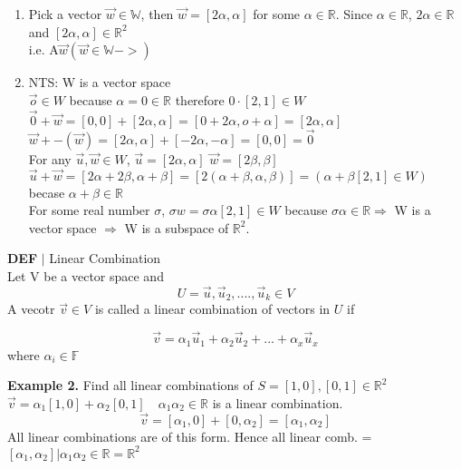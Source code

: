 \documentclass [12pt]{article}
\begin{document}
\begin{enumerate}
    \item Pick a vector $\overrightarrow{w}\in\mathbb{W}$, then $\overrightarrow{w}=[2\alpha,\alpha]$ for some $\alpha\in\mathbb{R}$. Since $\alpha\in\mathbb{R}$,  $2\alpha\in\mathbb{R}$ and  $[2\alpha,\alpha]\in\mathbb{R}^2$\\
    i.e. A$\overrightarrow{w}(\overrightarrow{w}\in\mathbb{W}->)$
    \item NTS: W is a vector space \\
    $\overrightarrow{o}\in W$ because $\alpha=0\in\mathbb{R}$ therefore $0\cdot[2,1]\in W$\\
    $\overrightarrow{0} + \overrightarrow{w} = [0,0] + [2\alpha,\alpha] = [0+2\alpha,o+\alpha]=[2\alpha,\alpha]$\\
    $\overrightarrow{w} + -(\overrightarrow{w}) = [2\alpha,\alpha] + [-2\alpha,-\alpha] = [0,0] = \overrightarrow{0}$\\
    For any $\overrightarrow{u},\overrightarrow{w}\in W$, $\overrightarrow{u}=[2\alpha,\alpha]$ $\overrightarrow{w}=[2\beta,\beta]$\\
    $\overrightarrow{u} + \overrightarrow{w}=[2\alpha+2\beta,\alpha+\beta]=[2(\alpha+\beta,\alpha,\beta)]=(\alpha+\beta[2,1]\in W)$ becase $\alpha +\beta\in\mathbb{R}$\\
    For some real number $\sigma$, $\sigma w = \sigma \alpha[2,1]\in W$ because $\sigma\alpha\in\mathbb{R}\Rightarrow$ W is a vector space $\Rightarrow$ W is a subspace of $\mathbb{R}^2$.
\end{enumerate}
\begin{framed}
\noindent\textbf{DEF} $|$ Linear Combination \\
Let V be a vector space and 
\[U={\overrightarrow{u},\overrightarrow{u}_2,....,\overrightarrow{u}_k}\in V\]
A vecotr $\overrightarrow{v}\in V$ is called  a linear combination of vectors in $U$ if

\[\overrightarrow{v}=\alpha_1\overrightarrow{u}_1+\alpha_2\overrightarrow{u}_2+...+\alpha_x\overrightarrow{u}_x\]
where $\alpha_i\in\mathbb{F}$
\end{framed}
\textbf{Example 2. } Find all linear combinations of $S={[1,0], [0,1]}\in\mathbb{R}^2$\\
$\overrightarrow{v} = \alpha_1[1,0]+\alpha_2[0,1]\quad\alpha_1\alpha_2\in\mathbb{R}$ is a linear combination.
\[\overrightarrow{v} = [\alpha_1,0] + [0,\alpha_2] = [\alpha_1,\alpha_2]\]
All linear combinations are of this form. Hence all linear comb. = ${[\alpha_1,\alpha_2]|\alpha_1\alpha_2\in\mathbb{R}} = \mathbb{R}^2$
\end{document}
